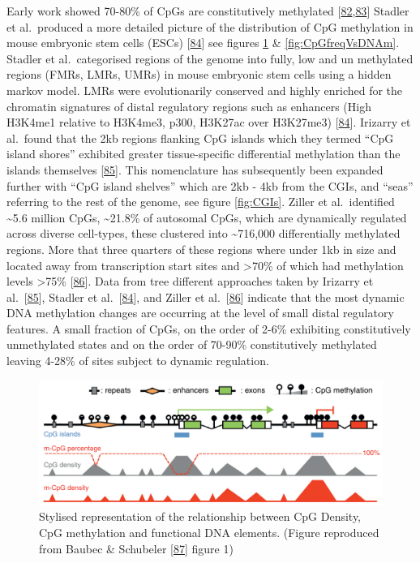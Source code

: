 \documentclass[
]{book}
\begin{document}
Early work showed 70-80\% of CpGs are constitutively methylated {[}\protect\hyperlink{ref-Ehrlich1982}{82},\protect\hyperlink{ref-Bird2002}{83}{]} Stadler et al.~produced a more detailed picture of the distribution of CpG methylation in mouse embryonic stem cells (ESCs) {[}\protect\hyperlink{ref-Stadler2011}{84}{]} see figures \ref{fig:Baubec2014fig1} \& \ref{fig:CpGfreqVsDNAm}.
Stadler et al.~categorised regions of the genome into fully, low and un methylated regions (FMRs, LMRs, UMRs) in mouse embryonic stem cells using a hidden markov model.
LMRs were evolutionarily conserved and highly enriched for the chromatin signatures of distal regulatory regions such as enhancers (High H3K4me1 relative to H3K4me3, p300, H3K27ac over H3K27me3) {[}\protect\hyperlink{ref-Stadler2011}{84}{]}.
Irizarry et al.~found that the 2kb regions flanking CpG islands which they termed ``CpG island shores'' exhibited greater tissue-specific differential methylation than the islands themselves {[}\protect\hyperlink{ref-Irizarry2009}{85}{]}.
This nomenclature has subsequently been expanded further with ``CpG island shelves'' which are 2kb - 4kb from the CGIs, and ``seas'' referring to the rest of the genome, see figure \ref{fig:CGIs}.
Ziller et al.~identified \textasciitilde5.6 million CpGs, \textasciitilde21.8\% of autosomal CpGs, which are dynamically regulated across diverse cell-types, these clustered into \textasciitilde716,000 differentially methylated regions.
More that three quarters of these regions where under 1kb in size and located away from transcription start sites and \textgreater70\% of which had methylation levels \textgreater75\% {[}\protect\hyperlink{ref-Ziller2013}{86}{]}.
Data from tree different approaches taken by Irizarry et al.~{[}\protect\hyperlink{ref-Irizarry2009}{85}{]}, Stadler et al.~{[}\protect\hyperlink{ref-Stadler2011}{84}{]}, and Ziller et al.~{[}\protect\hyperlink{ref-Ziller2013}{86}{]} indicate that the most dynamic DNA methylation changes are occurring at the level of small distal regulatory features.
A small fraction of CpGs, on the order of 2-6\% exhibiting constitutively unmethylated states and on the order of 70-90\% constitutively methylated leaving 4-28\% of sites subject to dynamic regulation.

\begin{figure}

{\centering \includegraphics[width=0.8\linewidth]{figs/Baubec2014_fig1} 

}

\caption{Stylised representation of the relationship between CpG Density, CpG methylation and functional DNA elements. (Figure reproduced from Baubec \& Schubeler {[}\protect\hyperlink{ref-Baubec2014}{87}{]} figure 1)}\label{fig:Baubec2014fig1}
\end{figure}
\end{document}
